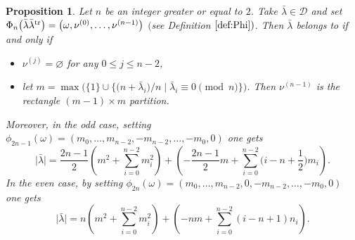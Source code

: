 \documentclass[pdftex]{sigma}
\newtheorem{Proposition}[Theorem]{Proposition}
 { \theoremstyle{definition}
\newtheorem{Definition}[Theorem]{Definition}
\newtheorem{Note}[Theorem]{Note}
\newtheorem{Example}[Theorem]{Example}
\newtheorem{Remark}[Theorem]{Remark} }
\numberwithin{equation}{section}
\newcommand{\cC}{\mathcal{C}}
\def\cch{\mathcal H}
\def\ccdd{\mathcal {DD}}
\def\ccd{\mathcal {D}}
\newcommand{\N}{\mathbb{N}}
\begin{document}
\begin{Proposition}
	\label{prop:ddprime} Let $n$ be an integer greater or equal to $2$. Take $%
	\bar{\lambda}\in \ccd$ and set $\Phi _{n}\bigl(\bar{\lambda}\bar{\lambda}^{%
		\mathrm{tr}}\bigr)=\smash{\bigl( \omega ,\nu ^{(0)},\dots ,\nu ^{(n-1)}\bigr)} $ $($see
	Definition $\ref{def:Phi})$. Then $\bar{\lambda}$ belongs to \smash{$\cC_{n}^{d,%
		\mathrm{tr},r}$} if and only if
	\begin{itemize}\itemsep=0pt
		\item $\nu^{(j)}=\varnothing$ for any $0\leq j\leq n-2$,
		
		\item let $m=\max\bigl(\lbrace 1\rbrace\cup\bigl\lbrace\bigl(n+\bar{\lambda}_i\bigr)/n \mid
		\bar{\lambda}_i\equiv 0\pmod{n}\bigr\rbrace\bigr)$. Then $\nu^{(n-1)}$ is the rectangle
		${(m-1)\times m}$ partition.
	\end{itemize}
	
	Moreover, in the odd case, setting $\phi _{2n-1}(\omega )=(m_{0},\dots
	,m_{n-2},-m_{n-2},\dots ,-m_{0},0)$ one gets%
	\begin{equation}
	\bigl\lvert \bar{\lambda}\bigr\rvert =\frac{2n-1}{2}\left(
	m^{2}+\sum_{i=0}^{n-2}m_{i}^{2}\right) +\left( -\frac{2n-1}{2}%
	m+\sum_{i=0}^{n-2}\biggl(i-n+\frac{1}{2}\biggr)m_{i}\right) . \label{eq:gkddnuimpair}
	\end{equation}%
	In the even case, by setting $\phi _{2n}(\omega )=(m_{0},\dots
	,m_{n-2},0,-m_{n-2},\dots ,-m_{0},0)$ one gets%
	\begin{equation}
	\bigl\lvert \bar{\lambda}\bigr\rvert =n\left( m^{2}+\sum_{i=0}^{n-2}m_{i}^{2}\right)
	+\left( -nm+\sum_{i=0}^{n-2}(i-n+1)n_{i}\right) .
	\label{eq:gkddnupairbvtquot}
	\end{equation}%
\end{Proposition}
\end{document}
